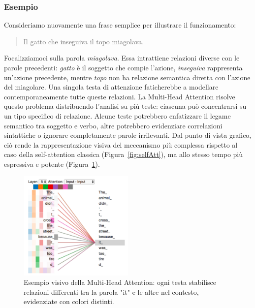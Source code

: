 \subsubsection{Esempio}

Consideriamo nuovamente una frase semplice per illustrare il funzionamento:

\begin{quote}
Il gatto che inseguiva il topo miagolava.
\end{quote}

Focalizziamoci sulla parola \textit{miagolava}. Essa intrattiene relazioni diverse con le parole precedenti: \textit{gatto} è il soggetto che compie l’azione, \textit{inseguiva} rappresenta un’azione precedente, mentre \textit{topo} non ha relazione semantica diretta con l’azione del miagolare. Una singola testa di attenzione faticherebbe a modellare contemporaneamente tutte queste relazioni. La Multi-Head Attention risolve questo problema distribuendo l’analisi su più teste: ciascuna può concentrarsi su un tipo specifico di relazione. Alcune teste potrebbero enfatizzare il legame semantico tra soggetto e verbo, altre potrebbero evidenziare correlazioni sintattiche o ignorare completamente parole irrilevanti. Dal punto di vista grafico, ciò rende la rappresentazione visiva del meccanismo più complessa rispetto al caso della self-attention classica (Figura~\ref{fig:selfAtt}), ma allo stesso tempo più espressiva e potente (Figura~\ref{fig:multiHeadAtt}).

\begin{figure}
    \centering
    \includegraphics[width=0.5\textwidth]{figure/MultiHeadAttention}
    \caption{Esempio visivo della Multi-Head Attention: ogni testa stabilisce relazioni differenti tra la parola "it" e le altre nel contesto, evidenziate con colori distinti.}
    \label{fig:multiHeadAtt}
\end{figure}


